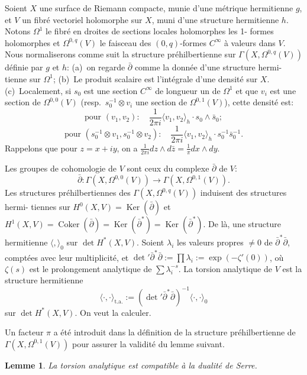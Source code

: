 \documentclass[12pt,a4paper]{article}
\theoremstyle{plain}
\newtheorem{lemma}[theorem]{Lemme}
\theoremstyle{definition}
\DeclareMathOperator{\Ker}{Ker}
\DeclareMathOperator{\Coker}{Coker}
\begin{document}
Soient $X$ une surface de Riemann compacte, munie d'une m\'etrique hermitienne
$g$, et $V$ un fibr\'e vectoriel holomorphe sur $X$, muni d'une structure hermitienne
$h$. Notons $\Omega^1$ le fibr\'e en droites de sections locales holomorphes les 1-
formes holomorphes et $\Omega^{0,q}(V)$ le faisceau des $(0,q)$-formes $C^\infty$ \`a valeurs dans
$V$. Nous normaliserons comme suit la structure pr\'ehilbertienne sur $\Gamma(X, \Omega^{0,q}(V))$
d\'efinie par $g$ et $h$: (a)~on regarde $\bar\partial$ comme la donn\'ee d'une structure hermi-
tienne sur $\Omega^1$; (b)~Le produit scalaire est l'int\'egrale d'une densit\'e sur $X$.
(c)~Localement, si $s_0$ est une section $C^\infty$ de longueur un de $\Omega^1$ et que $v_i$ est
une section de $\Omega^{0,0}(V)$ (resp.\ $s_0^{-1} \otimes v_i$ une section de $\Omega^{0,1}(V)$), cette densit\'e
est:
\[
\text{pour } (v_1, v_2): \quad \frac{1}{2\pi i} \langle v_1, v_2 \rangle_h \cdot s_0 \wedge \bar s_0 ;
\]
\[
\text{pour } (s_0^{-1} \otimes v_1, s_0^{-1} \otimes v_2): \quad \frac{1}{2\pi i} \langle v_1, v_2 \rangle_h \cdot s_0^{-1} \bar s_0^{-1} .
\]
Rappelons que pour $z = x + iy$, on a $\frac{1}{2\pi i} dz \wedge d\bar z = \frac{1}{\pi} dx \wedge dy$.

Les groupes de cohomologie de $V$ sont ceux du complexe $\bar\partial$ de $V$:
\[
\bar\partial: \Gamma(X, \Omega^{0,0}(V)) \longrightarrow \Gamma(X, \Omega^{0,1}(V)) .
\]
Les structures pr\'ehilbertiennes des $\Gamma(X, \Omega^{0,q}(V))$ induisent des structures hermi-
tiennes sur $H^0(X,V) = \Ker(\bar\partial)$ et $H^1(X,V) = \Coker(\bar\partial) = \Ker(\bar\partial^*) = \Ker(\bar\partial^*)$. De l\`a,
une structure hermitienne $\langle , \rangle_0$ sur $\det H^*(X,V)$. Soient $\lambda_i$ les valeurs
propres $\neq 0$ de $\bar\partial^*\bar\partial$, compt\'ees avec leur multiplicit\'e, et $\det' \bar\partial^*\bar\partial := \prod \lambda_i :=
\exp(-\zeta'(0))$, o\`u $\zeta(s)$ est le prolongement analytique de $\sum \lambda_i^{-s}$. La torsion
analytique de $V$ est la structure hermitienne
\[
\langle \cdot, \cdot \rangle_{\text{t.a.}} := (\det' \bar\partial^*\bar\partial)^{-1} \langle \cdot, \cdot \rangle_0
\]
sur $\det H^*(X,V)$. On veut la calculer.

Un facteur $\pi$ a \'et\'e introduit dans la d\'efinition de la structure pr\'ehilbertienne
de $\Gamma(X, \Omega^{0,1}(V))$ pour assurer la validit\'e du lemme suivant.

\begin{lemma}
La torsion analytique est compatible \`a la dualit\'e de Serre.
\end{lemma}
\end{document}
